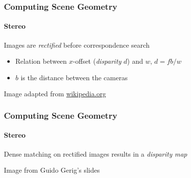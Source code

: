 \documentclass[xetex,professionalfont]{beamer}
\begin{document}

\begin{frame}
\frametitle{Computing Scene Geometry}
\framesubtitle{Stereo}

Images are \emph{rectified} before correspondence search %
\begin{itemize}
    \item Relation between $x$-offset (\emph{disparity} $d$) and $w$, $d=fb/w$ %
    \item $b$ is the distance between the cameras %
\end{itemize}


\bigskip
\begin{center}
    {\centering Image adapted from \url{wikipedia.org}}
\end{center}

\end{frame}


\begin{frame}
\frametitle{Computing Scene Geometry}
\framesubtitle{Stereo}

Dense matching on rectified images results in a \emph{disparity map}

\bigskip
\begin{center}
    {\centering Image from Guido Gerig's slides}
\end{center}

\end{frame}
\end{document}
